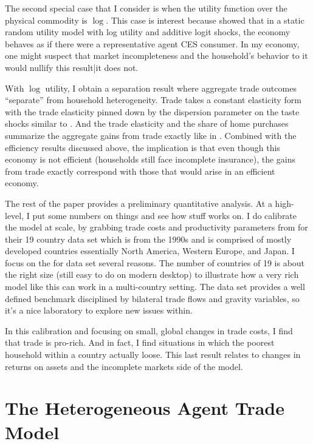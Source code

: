 \documentclass[12pt,pdftex]{article}
\begin{document}
\begin{onehalfspacing}
The second special case that I consider is when the utility function over the physical commodity is $\log$. This case is interest because \citet*{anderson1987ces} showed that in a static random utility model with log utility and additive logit shocks, the economy behaves as if there were a representative agent CES consumer. In my economy, one might suspect that market incompleteness and the household's behavior to it would nullify this result|it does not.

With $\log$ utility, I obtain a separation result where aggregate trade outcomes ``separate'' from household heterogeneity. Trade takes a constant elasticity form with the trade elasticity pinned down by the dispersion parameter on the taste shocks similar to \citet{eaton2002technology}. And the trade elasticity and the share of home purchases summarize the aggregate gains from trade exactly like in \citet{arkolakis2012new}. Combined with the efficiency results discussed above, the implication is that even though this economy is not efficient (households still face incomplete insurance), the gains from trade exactly correspond with those that would arise in an efficient economy.

The rest of the paper provides a preliminary quantitative analysis. At a high-level, I put some numbers on things and see how stuff works on. I do calibrate the model at scale, by grabbing trade costs and productivity parameters from \citet{eaton2002technology} for their 19 country data set which is from the 1990s and is comprised of mostly developed countries essentially North America, Western Europe, and Japan. I focus on the \citet{eaton2002technology} for data set several reasons. The number of countries of 19 is about the right size (still easy to do on modern desktop) to illustrate how a very rich model like this can work in a multi-country setting. The \citet{eaton2002technology} data set provides a well defined benchmark disciplined by bilateral trade flows and gravity variables, so it's a nice laboratory to explore new issues within.

In this calibration and focusing on small, global changes in trade costs, I find that trade is pro-rich. And in fact, I find situations in which the poorest household within a country actually loose. This last result relates to changes in returns on assets and the incomplete markets side of the model.



\section{The Heterogeneous Agent Trade Model}


\end{onehalfspacing}
\end{document}
